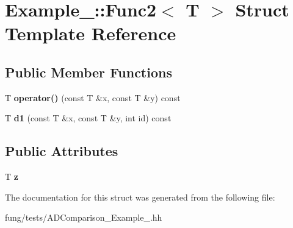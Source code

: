 \hypertarget{structExample__3_1_1Func2}{\section{Example\-\_\-:\-:Func2$<$ T $>$ Struct Template Reference}
\label{structExample__3_1_1Func2}
}
\subsection*{Public Member Functions}
\begin{DoxyCompactItemize}
\item 
\hypertarget{structExample__3_1_1Func2_a214e9f5ca3a04529f8f81712fef7c0e8}{T {\bfseries operator()} (const T \&x, const T \&y) const }\label{structExample__3_1_1Func2_a214e9f5ca3a04529f8f81712fef7c0e8}

\item 
\hypertarget{structExample__3_1_1Func2_a3b398e57b95501e4a0a35eb24cd40ddd}{T {\bfseries d1} (const T \&x, const T \&y, int id) const }\label{structExample__3_1_1Func2_a3b398e57b95501e4a0a35eb24cd40ddd}

\end{DoxyCompactItemize}
\subsection*{Public Attributes}
\begin{DoxyCompactItemize}
\item 
\hypertarget{structExample__3_1_1Func2_a79b627c06b9d7005fdc1cfc744150e7c}{T {\bfseries z}}\label{structExample__3_1_1Func2_a79b627c06b9d7005fdc1cfc744150e7c}

\end{DoxyCompactItemize}


The documentation for this struct was generated from the following file\-:\begin{DoxyCompactItemize}
\item 
fung/tests/A\-D\-Comparison\-\_\-\-Example\-\_.\-hh\end{DoxyCompactItemize}
